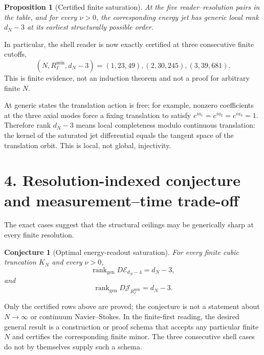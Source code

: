 \documentclass[10pt,leqno,twoside]{article}
\newcommand{\rankgen}{\operatorname{rank}_{\mathrm{gen}}}
\theoremstyle{plain}
\newtheorem{proposition}{Proposition}
\newtheorem{conjecture}{Conjecture}
\theoremstyle{remark}
\begin{document}
\begin{proposition}[Certified finite saturation]
At the five reader--resolution pairs in the table, and for every $\nu>0$, the corresponding
energy jet has generic local rank $d_N-3$ at its earliest structurally possible order.
\end{proposition}

In particular, the shell reader is now exactly certified at three consecutive finite cutoffs,
\begin{equation}
\boxed{(N,R_I^{\min},d_N-3)=(1,23,49),(2,30,245),(3,39,681).}
\end{equation}
This is finite evidence, not an induction theorem and not a proof for arbitrary finite $N$.

At generic states the translation action is free; for example, nonzero coefficients at the
three axial modes force a fixing translation to satisfy
$e^{ia_1}=e^{ia_2}=e^{ia_3}=1$.  Therefore rank $d_N-3$ means local completeness modulo
continuous translation: the kernel of the saturated jet differential equals the tangent
space of the translation orbit.  This is local, not global, injectivity.

\section*{4. Resolution-indexed conjecture and measurement--time trade-off}

The exact cases suggest that the structural ceilings may be generically sharp at every finite
resolution.

\begin{conjecture}[Optimal energy-readout saturation]
For every finite cubic truncation $K_N$ and every $\nu>0$,
\begin{equation}
\boxed{\rankgen D\mathcal E_{d_N-4}=d_N-3,}
\end{equation}
and
\begin{equation}
\boxed{\rankgen D\mathcal J_{R_I^{\min}}=d_N-3.}
\end{equation}
\end{conjecture}

Only the certified rows above are proved; the conjecture is not a statement about
$N\to\infty$ or continuum Navier--Stokes.  In the finite-first reading, the desired general
result is a construction or proof schema that accepts any particular finite $N$ and certifies
the corresponding finite minor.  The three consecutive shell cases do not by themselves
supply such a schema.
\end{document}
